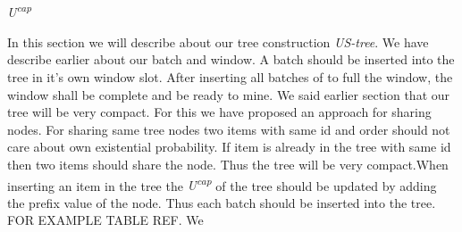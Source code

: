 \paragraph*{}
\emph{U\textsuperscript{cap}}  

In this section we will describe about our tree construction \emph{US-tree}. We have describe earlier about our batch and window. A batch should be inserted into the tree in it's own window slot. After inserting all batches of to full the window, the window shall be complete and be ready to mine. We said earlier section that our tree will be very compact. For this we have proposed an approach for sharing nodes. For sharing same tree nodes two items with same id and order should not care about own existential probability. If item is already in the tree with same id then two items should share the node. Thus the tree will be very compact.When inserting an item in the tree the \emph{U\textsuperscript{cap}}  of the tree should be updated by adding the prefix value of the node. Thus each batch should be inserted into the tree. FOR EXAMPLE TABLE REF. We 
